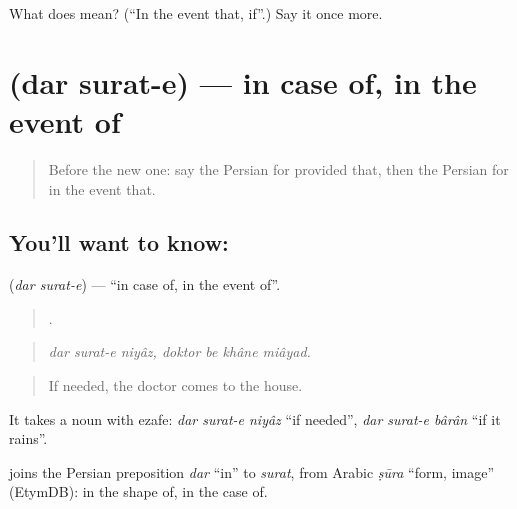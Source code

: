 \begin{tcolorbox}[breakable,colback=teal!4,colframe=teal!35!black,title={Before you move on}]
What does    mean? (\textquotedblleft{}In the event that, if\textquotedblright{}.) Say it once more.
\end{tcolorbox}
\section[\texorpdfstring{\fa{در} \fa{صورت} (dar surat-e)}{در صورت (dar surat-e)}]{  (dar surat-e) — in case of, in the event of}

\label{lesson:FA-C390-dar-surat-e}



\begin{quote}
Before the new one: say the Persian for provided that, then the Persian for in the event that.
\end{quote}

\subsection*{You'll want to know:  }
\textbf{ } (\emph{dar surat-e}) — \textquotedblleft{}in case of, in the event of\textquotedblright{}.

\begin{quote}
      .
\end{quote}

\begin{quote}
\emph{dar surat-e niyâz, doktor be khâne miâyad.}
\end{quote}

\begin{quote}
If needed, the doctor comes to the house.
\end{quote}

It takes a noun with ezafe: \emph{dar surat-e niyâz} \textquotedblleft{}if needed\textquotedblright{}, \emph{dar surat-e bârân} \textquotedblleft{}if it rains\textquotedblright{}.

\begin{cousinweb}
\textbf{ } joins the Persian preposition \emph{dar} \textquotedblleft{}in\textquotedblright{} to \emph{surat}, from Arabic \emph{ṣūra} \textquotedblleft{}form, image\textquotedblright{} (EtymDB): in the shape of, in the case of.
\end{cousinweb}

